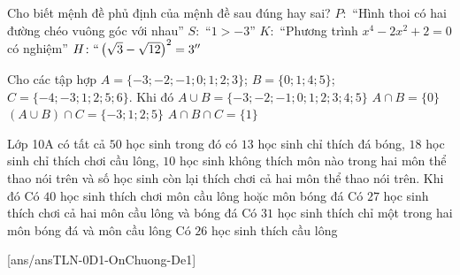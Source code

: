 \begin{ex}%
Cho biết mệnh đề phủ định của mệnh đề sau đúng hay sai?
\choiceTF
{$P\colon$ ``Hình thoi có hai đường chéo vuông góc với nhau''}
{$S\colon$ ``$1>-3$''}
{\True $K\colon$ ``Phương trình $x^4-2x^2+2=0$ có nghiệm''}
{$H\colon``\left(\sqrt{3}-\sqrt{12}\right)^2=3''$}
\end{ex}

\begin{ex}%
Cho các tập hợp $A=\{-3;-2;-1;0;1;2;3\}$; $B=\{0;1;4;5\}$; $C=\{-4;-3;1;2;5;6\}$. Khi đó
\choiceTF
{\True $A\cup B=\{-3;-2;-1;0;1;2;3;4;5\}$}
{$A\cap B=\{0\}$}
{\True $(A\cup B)\cap C=\{-3;1;2;5\}$}
{\True $A\cap B\cap C=\{1\}$}
\end{ex}

\begin{ex}%
Lớp 10A có tất cả $50$ học sinh trong đó có $13$ học sinh chỉ thích đá bóng, $18$ học sinh chỉ thích chơi cầu lông, $10$ học sinh không thích môn nào trong hai môn thể thao nói trên và số học sinh còn lại thích chơi cả hai môn thể thao nói trên. Khi đó
\choiceTF
{\True Có $40$ học sinh thích chơi môn cầu lông hoặc môn bóng đá}
{Có $27$ học sinh thích chơi cả hai môn cầu lông và bóng đá}
{\True Có $31$ học sinh thích chỉ một trong hai môn bóng đá và môn cầu lông}
{Có $26$ học sinh thích cầu lông}
\end{ex}
\TNSA
\setcounter{ex}{0}
[ans/ansTLN-0D1-OnChuong-De1]


